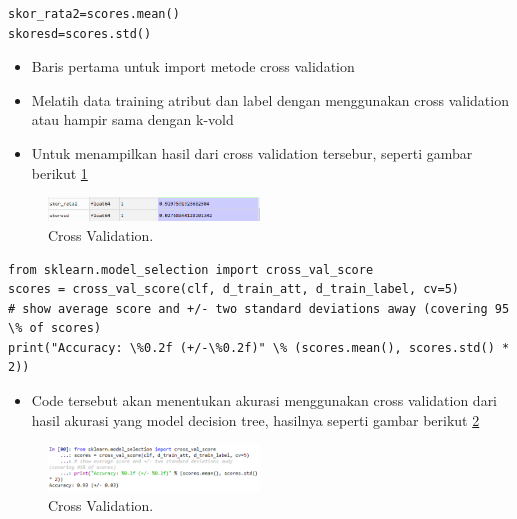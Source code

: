 \begin{enumerate}
\begin{verbatim}
skor_rata2=scores.mean()
skoresd=scores.std()
\end{verbatim}
\begin{itemize}
\item Baris pertama untuk import metode cross validation
\item Melatih data training atribut dan label dengan menggunakan cross validation atau hampir sama dengan k-vold
\item Untuk menampilkan hasil dari cross validation tersebur, seperti gambar berikut \ref{yt14}
\end{itemize}
		\begin{figure}[ht]
		\centerline{\includegraphics[width=0.5\textwidth]{figures/im/yt14.png}}
		\caption{Cross Validation.}
		\label{yt14}
		\end{figure}

\begin{verbatim}
from sklearn.model_selection import cross_val_score
scores = cross_val_score(clf, d_train_att, d_train_label, cv=5)
# show average score and +/- two standard deviations away (covering 95 \% of scores)
print("Accuracy: \%0.2f (+/-\%0.2f)" \% (scores.mean(), scores.std() * 2))
\end{verbatim}
\begin{itemize}
\item Code tersebut akan menentukan akurasi menggunakan cross validation dari hasil akurasi yang model decision tree, hasilnya seperti gambar berikut \ref{yt15}
\end{itemize}
		\begin{figure}[ht]
		\centerline{\includegraphics[width=0.5\textwidth]{figures/im/yt15.png}}
		\caption{Cross Validation.}
		\label{yt15}
		\end{figure}


\end{enumerate}
